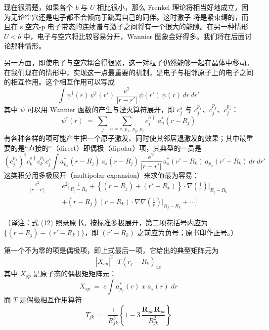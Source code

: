 现在很清楚，如果各个 $b$ 与 $U$ 相比很小，那么 Frenkel 理论将相当好地成立，因为无论空穴还是电子都不会倾向于跳离自己的同伴。这时激子
将是紧束缚的，而且在 s 空穴-p 电子带态的连续谱与激子之间将有一个很大的能隙。在另一种情形 $U < b$ 中，电子与空穴将比较容易分开，Wannier 图象会好得多。我们将在后面讨论那种情形。

另一方面，即使电子与空穴耦合得很紧，这一对粒子仍然能够一起在晶体中移动。在我们现在的情形中，实现这一点最重要的机制，是电子与相邻原子上的电子之间的相互作用。这个相互作用可以写成
\begin{equation*}
\int \psi^{\dagger}(r)\,\psi^{\dagger}(r')\,\frac{e^2}{|r-r'|}\,\psi(r')\,\psi(r)\,dr\,dr' \tag{11}
\end{equation*}
其中 $\psi$ 可以用 Wannier 函数的产生与湮灭算符展开，即 $c_j^s$ 与 $c_j^{p_x}$、$c_j^{p_y}$、$c_j^{p_z}$：
\begin{equation*}
\psi^{\dagger}(r) \;=\; \sum_j \sum_{n=s,\,p_x,\,p_y,\,p_z} c_j^{n\dagger}\, a_n^{*}(r-R_j)
\end{equation*}
有各种各样的项可能产生把一个原子激发、同时使其邻居退激发的效果；其中最重要的是“直接的”（direct）即偶极（dipolar）项，其典型的一员是
\begin{equation*}
\left(c_j^{p_x}\right)^{\dagger} c_k^{s\dagger} c_k^{p_x} c_j^{s} \int a_{p_x}^{*}(r-R_j)\, a_s(r-R_j)\, \frac{e^2}{|r-r'|}\, a_s^{*}(r'-R_k)\, a_{p_x}(r'-R_k)\, dr\, dr'
\end{equation*}
这类积分用多极展开（multipolar expansion）来求值最为容易：
\begin{align*}
\frac{e^2}{|r-r'|} = \; & e^2 \Bigg[ \frac{1}{R_j - R_k} + \left\{ (r-R_j) + (r'-R_k) \right\} \cdot \nabla\!\left(\frac{1}{r}\right)\Big|_{R_j-R_k} \\
& + (r-R_j)(r-R_k) \cdot \nabla\nabla\!\left(\frac{1}{r}\right)\Big|_{R_j-R_k} + \cdots \Bigg] \tag{12}
\end{align*}

（译注：式 (12) 照录原书。按标准多极展开，第二项花括号内应为 $\{(r-R_j)-(r'-R_k)\}$，即 $(r'-R_k)$ 之前应为负号；原书印作正号。）

第一个不为零的项是偶极项，即上式最后一项，它给出的典型矩阵元为
\begin{equation*}
|X_{sp}|^2 \cdot T(r_j - R_k)_{xx}
\end{equation*}
其中 $X_{sp}$ 是原子态的偶极矩矩阵元：
\begin{equation*}
X_{sp} \;=\; e \int a_{p_x}^{*}(r)\; x\; a_s(r)\; dr
\end{equation*}
而 $T$ 是偶极相互作用算符
\begin{equation*}
T_{jk} \;=\; \frac{1}{R_{jk}^{3}} \left\{ 1 - 3\,\frac{\mathbf{R}_{jk}\,\mathbf{R}_{jk}}{R_{jk}^{2}} \right\}
\end{equation*}

